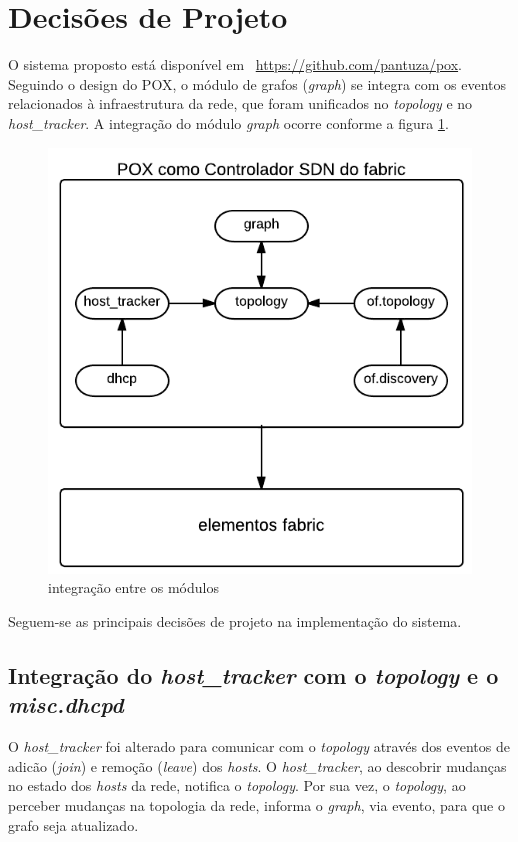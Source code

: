\section{Decisões de Projeto}
\label{sec:project}
O sistema proposto está disponível em \, \url{https://github.com/pantuza/pox}.
Seguindo o design do POX, 
o módulo de grafos (\emph{graph}) se integra com 
os eventos relacionados à infraestrutura da rede,
que foram unificados no \emph{topology} e no \emph{host\_tracker}.
A integração do módulo \emph{graph} ocorre conforme a figura \ref{fig:design}.

\begin{figure}[h!]
    \centering
    \includegraphics[scale=0.4]{fabric_design.png}
    \caption{integração entre os módulos}
    \label{fig:design}
\end{figure}

Seguem-se as principais decisões de projeto na implementação do sistema.

\subsection{Integração do \emph{host\_tracker} com o \emph{topology} e o \emph{misc.dhcpd}}

O \emph{host\_tracker} foi alterado para 
comunicar com o \emph{topology} através dos eventos de 
adicão ({\it join}) e remoção ({\it leave}) dos {\it hosts}. 
O \emph{host\_tracker}, ao descobrir mudanças no estado dos \emph{hosts} da rede, 
notifica o \emph{topology}. 
Por sua vez, o \emph{topology}, ao perceber mudanças na topologia da rede, 
informa o \emph{graph}, via evento, para que o grafo seja atualizado. 

